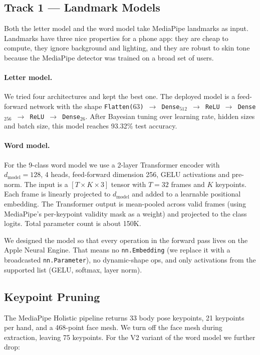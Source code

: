 \documentclass[11pt]{article}
\begin{document}
\subsection{Track 1 --- Landmark Models}

Both the letter model and the word model take MediaPipe landmarks as input. Landmarks have three nice properties for a phone app: they are cheap to compute, they ignore background and lighting, and they are robust to skin tone because the MediaPipe detector was trained on a broad set of users.

\paragraph{Letter model.} We tried four architectures and kept the best one. The deployed model is a feed-forward network with the shape \texttt{Flatten($63$) $\rightarrow$ Dense$_{512}$ $\rightarrow$ ReLU $\rightarrow$ Dense$_{256}$ $\rightarrow$ ReLU $\rightarrow$ Dense$_{26}$}. After Bayesian tuning over learning rate, hidden sizes and batch size, this model reaches 93.32\% test accuracy.

\paragraph{Word model.} For the 9-class word model we use a 2-layer Transformer encoder with $d_{\textrm{model}}=128$, 4 heads, feed-forward dimension 256, GELU activations and pre-norm. The input is a $[T\times K\times 3]$ tensor with $T=32$ frames and $K$ keypoints. Each frame is linearly projected to $d_{\textrm{model}}$ and added to a learnable positional embedding. The Transformer output is mean-pooled across valid frames (using MediaPipe's per-keypoint validity mask as a weight) and projected to the class logits. Total parameter count is about 150K.

We designed the model so that every operation in the forward pass lives on the Apple Neural Engine. That means no \texttt{nn.Embedding} (we replace it with a broadcasted \texttt{nn.Parameter}), no dynamic-shape ops, and only activations from the supported list (GELU, softmax, layer norm).

\subsection{Keypoint Pruning}

The MediaPipe Holistic pipeline returns 33 body pose keypoints, 21 keypoints per hand, and a 468-point face mesh. We turn off the face mesh during extraction, leaving 75 keypoints. For the V2 variant of the word model we further drop:
\end{document}
